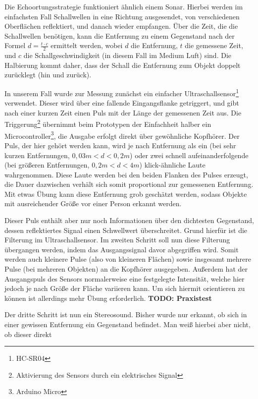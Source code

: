 \documentclass[a4paper,12pt,ngerman]{scrartcl}
\begin{document}
Die Echoortungsstrategie funktioniert ähnlich einem Sonar. Hierbei werden im einfachsten 
Fall Schallwellen in eine Richtung ausgesendet, von verschiedenen Oberflächen reflektiert,
und danach wieder empfangen. Über die Zeit, die die Schallwellen benötigen, kann die 
Entfernung zu einem Gegenstand nach der Formel $d = \frac{t \cdot c}{2}$ ermittelt werden,
wobei $d$ die Entfernung, $t$ die gemessene Zeit, und $c$ die Schallgeschwindigkeit (in 
diesem Fall im Medium Luft) sind. Die Halbierung kommt daher, dass der Schall die 
Entfernung zum Objekt doppelt zurücklegt (hin und zurück). \par
In unserem Fall wurde zur Messung zunächst ein einfacher Ultraschallsensor\footnote{HC-SR04} 
verwendet. Dieser wird über eine fallende Eingangsflanke getriggert, und gibt nach einer 
kurzen Zeit einen Puls mit der Länge der gemessenen Zeit aus. Die Triggerung\footnote{Aktivierung des
Sensors durch ein elektrisches Signal} übernimmt 
beim Prototypen der Einfachheit halber ein Microcontroller\footnote{Arduino Micro}, die 
Ausgabe erfolgt direkt über gewöhnliche Kopfhörer. Der Puls, der hier gehört werden kann, 
wird je nach Entfernung als ein (bei sehr kurzen Entfernungen, $0,03m < d < 0,2m$) oder 
zwei schnell aufeinanderfolgende (bei größeren Entfernungen, $0,2m < d < 4m$) klick-ähnliche 
Laute wahrgenommen. Diese Laute werden bei den beiden Flanken des Pulses erzeugt, die Dauer 
dazwischen verhält sich somit proportional zur gemessenen Entfernung. Mit etwas Übung kann 
diese Entfernung grob geschätzt werden, sodass Objekte mit ausreichender Größe vor einer 
Person erkannt werden. \par
Dieser Puls enthält aber nur noch Informationen über den dichtesten Gegenstand, dessen 
reflektiertes Signal einen Schwellwert überschreitet. Grund hierfür ist die Filterung im 
Ultraschallsensor. Im zweiten Schritt soll nun diese Filterung übergangen werden, indem 
das Ausgangssignal davor abgegriffen wird. Somit werden auch kleinere Pulse (also von 
kleineren Flächen) sowie insgesamt mehrere Pulse (bei mehreren Objekten) an die Kopfhörer 
ausgegeben. Außerdem hat der Ausgangspuls des Sensors normalerweise eine festgelegte 
Intensität, welche hier jedoch je nach Größe der Fläche variieren kann. Um sich hiermit 
orientieren zu können ist allerdings mehr Übung erforderlich. \textbf{TODO: Praxistest} \par
Der dritte Schritt ist nun ein Stereosound. Bisher wurde nur erkannt, ob sich in einer 
gewissen Entfernung ein Gegenstand befindet. Man weiß hierbei aber nicht, ob dieser direkt 
\end{document}
